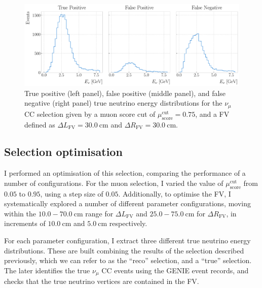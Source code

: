 \begin{figure}[t]
    \centering
    \includegraphics[width=.99\linewidth]{Images/GAr_selection/true_numu_example_spectra_horizontal.pdf}
    \caption[True positive, false positive, and false negative true neutrino energy distributions for a $\nu_{\mu}$ CC selection.]{True positive (left panel), false positive (middle panel), and false negative (right panel) true neutrino energy distributions for the $\nu_{\mu}$ CC selection given by a muon score cut of $\mu_{\mathrm{score}}^{\mathrm{cut}} = 0.75$, and a FV defined as $\Delta L_{\mathrm{FV}} = 30.0 ~ \mathrm{cm}$ and $\Delta R_{\mathrm{FV}} = 30.0 ~ \mathrm{cm}$.}
    \label{fig:numuCC_spectra_example}
\end{figure}

\subsection{Selection optimisation}

I performed an optimisation of this selection, comparing the performance of a number of configurations. For the muon selection, I varied the value of $\mu_{\mathrm{score}}^{\mathrm{cut}}$ from $0.05$ to $0.95$, using a step size of $0.05$. Additionally, to optimise the FV, I systematically explored a number of different parameter configurations, moving within the $10.0-70.0~\mathrm{cm}$ range for $\Delta L_{\mathrm{FV}}$ and $25.0-75.0~\mathrm{cm}$ for $\Delta R_{\mathrm{FV}}$, in increments of $10.0~\mathrm{cm}$ and $5.0~\mathrm{cm}$ respectively.

For each parameter configuration, I extract three different true neutrino energy distributions. These are built combining the results of the selection described previously, which we can refer to as the ``reco'' selection, and a ``true'' selection. The later identifies the true $\nu_{\mu}$ CC events using the GENIE event records, and checks that the true neutrino vertices are contained in the FV.

